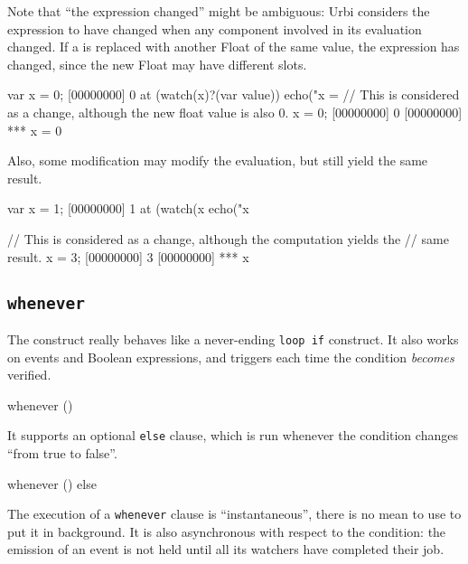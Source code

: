 Note that ``the expression changed'' might be ambiguous: Urbi considers the
expression to have changed when any component involved in its evaluation
changed.  If a  is replaced with another Float of the same
value, the expression has changed, since the new Float may have different
slots.

\begin{urbiscript}[firstnumber=1]
var x = 0;
[00000000] 0
at (watch(x)?(var value))
  echo("x = %
// This is considered as a change, although the new float value is also 0.
x = 0;
[00000000] 0
[00000000] *** x = 0
\end{urbiscript}

Also, some modification may modify the evaluation, but still yield the same
result.

\begin{urbiscript}[firstnumber=1]
var x = 1;
[00000000] 1
at (watch(x %
  echo("x %

// This is considered as a change, although the computation yields the
// same result.
x = 3;
[00000000] 3
[00000000] *** x %
\end{urbiscript}


\subsection{\lstinline{whenever}}
\label{sec:lang:whenever}

The  construct really behaves like a never-ending
\lstinline|loop if| construct.  It also works on events and Boolean
expressions, and triggers each time the condition \emph{becomes} verified.

\begin{urbiunchecked}
whenever ()
\end{urbiunchecked}

It supports an optional \lstinline{else} clause, which is run whenever
the condition changes ``from true to false''.

\begin{urbiunchecked}
whenever ()
else
\end{urbiunchecked}

The execution of a \lstinline{whenever} clause is ``instantaneous'',
there is no mean to use \samp{,} to put it in background.  It is also
asynchronous with respect to the condition: the emission of an event
is not held until all its watchers have completed their job.

